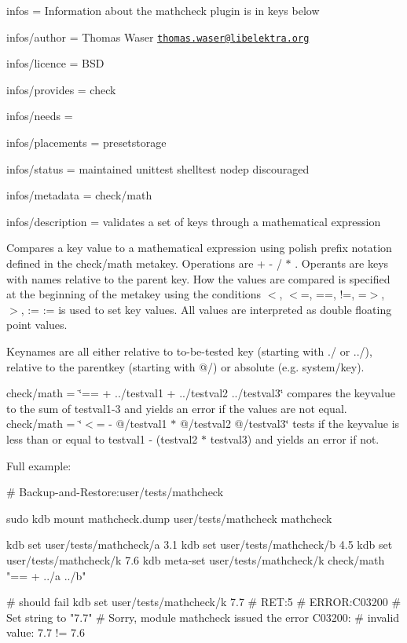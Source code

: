 
\begin{DoxyItemize}
\item infos = Information about the mathcheck plugin is in keys below
\item infos/author = Thomas Waser \href{mailto:thomas.waser@libelektra.org}{\tt thomas.\+waser@libelektra.\+org}
\item infos/licence = B\+SD
\item infos/provides = check
\item infos/needs =
\item infos/placements = presetstorage
\item infos/status = maintained unittest shelltest nodep discouraged
\item infos/metadata = check/math
\item infos/description = validates a set of keys through a mathematical expression
\end{DoxyItemize}

Compares a key value to a mathematical expression using polish prefix notation defined in the {\ttfamily check/math} metakey. Operations are {\ttfamily + -\/ / $\ast$} . Operants are keys with names relative to the parent key. How the values are compared is specified at the beginning of the metakey using the conditions {\ttfamily $<$, $<$=, ==, !=, =$>$, $>$, \+:=} {\ttfamily \+:=} is used to set key values. All values are interpreted as {\ttfamily double} floating point values.

Keynames are all either relative to to-\/be-\/tested key (starting with {\ttfamily ./} or {\ttfamily ../}), relative to the parentkey (starting with {\ttfamily @/}) or absolute (e.\+g. {\ttfamily system/key}).

{\ttfamily check/math = \char`\"{}== + ../testval1 + ../testval2 ../testval3\char`\"{}} compares the keyvalue to the sum of testval1-\/3 and yields an error if the values are not equal. {\ttfamily check/math = \char`\"{}$<$= -\/ @/testval1 $\ast$ @/testval2 @/testval3\char`\"{}} tests if the keyvalue is less than or equal to {\ttfamily testval1 -\/ (testval2 $\ast$ testval3)} and yields an error if not.

Full example\+:


\begin{DoxyCode}
# Backup-and-Restore:user/tests/mathcheck

sudo kdb mount mathcheck.dump user/tests/mathcheck mathcheck

kdb set user/tests/mathcheck/a 3.1
kdb set user/tests/mathcheck/b 4.5
kdb set user/tests/mathcheck/k 7.6
kdb meta-set user/tests/mathcheck/k check/math "== + ../a ../b"

# should fail
kdb set user/tests/mathcheck/k 7.7
# RET:5
# ERROR:C03200
# Set string to "7.7"
# Sorry, module mathcheck issued the error C03200:
# invalid value: 7.7 != 7.6
\end{DoxyCode}



